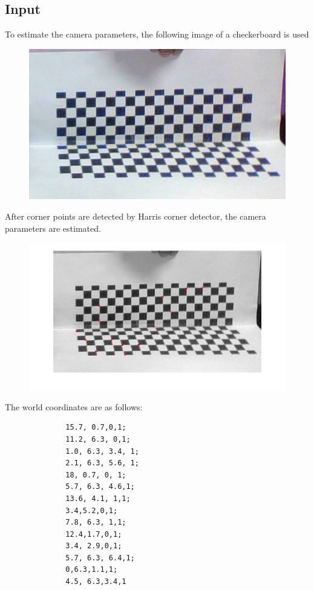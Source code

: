 \documentclass[12pt]{article}
\begin{document}
\subsection{Input}
To estimate the camera parameters, the following  image of a checkerboard is used
\begin{figure}[htp]
\centering
\includegraphics[width=1\textwidth]{Checkerboard4.jpg}\hfill
\end{figure}
\clearpage

After corner points are detected by Harris corner detector, the camera parameters are estimated.
\begin{figure}[htp]
\centering
\includegraphics[width=1\textwidth]{harris2.jpg}\hfill
\end{figure}
\clearpage
The world coordinates are as follows:
\begin{lstlisting} 
  			  15.7, 0.7,0,1;
              11.2, 6.3, 0,1;
              1.0, 6.3, 3.4, 1;
              2.1, 6.3, 5.6, 1;
              18, 0.7, 0, 1;
              5.7, 6.3, 4.6,1;
              13.6, 4.1, 1,1;
              3.4,5.2,0,1;
              7.8, 6.3, 1,1;
              12.4,1.7,0,1;
              3.4, 2.9,0,1;
              5.7, 6.3, 6.4,1;
              0,6.3,1.1,1;
              4.5, 6.3,3.4,1
   \end{lstlisting}
   
\end{document}
